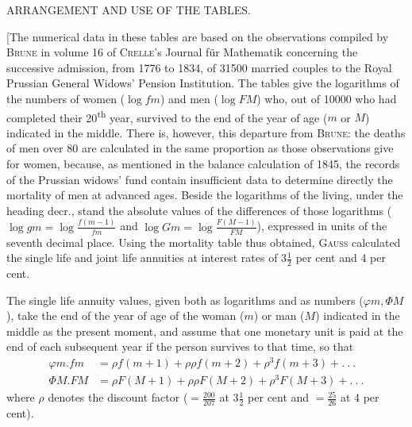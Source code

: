 \clearpage
{}
\begin{center}ARRANGEMENT AND USE OF THE TABLES.\end{center}
\noindent\hspace*{1.2em} [The numerical data in these tables are based on the observations compiled by \textsc{Brune} in volume 16 of \textsc{Crelle}'s Journal für Mathematik concerning the successive admission, from 1776 to 1834, of 31500 married couples to the Royal Prussian General Widows' Pension Institution. The tables give the logarithms of the numbers of women (\(\log fm\)) and men (\(\log FM\)) who, out of 10000 who had completed their 20\textsuperscript{th} year, survived to the end of the year of age (\(m\) or \(M\)) indicated in the middle. There is, however, this departure from \textsc{Brune}: the deaths of men over 80 are calculated in the same proportion as those observations give for women, because, as mentioned in the balance calculation of 1845, the records of the Prussian widows' fund contain insufficient data to determine directly the mortality of men at advanced ages. Beside the logarithms of the living, under the heading decr., stand the absolute values of the differences of those logarithms (\(\log gm=\log\frac{f(m-1)}{fm}\) and \(\log Gm=\log\frac{F(M-1)}{FM}\)), expressed in units of the seventh decimal place. Using the mortality table thus obtained, \textsc{Gauss} calculated the single life and joint life annuities at interest rates of \(3\tfrac{1}{2}\) per cent and 4 per cent.

The single life annuity values, given both as logarithms and as numbers (\(\varphi m,\Phi M\)), take the end of the year of age of the woman (\(m\)) or man (\(M\)) indicated in the middle as the present moment, and assume that one monetary unit is paid at the end of each subsequent year if the person survives to that time, so that
\[
\begin{aligned}
\varphi m\mathord{.}fm&=\rho f(m+1)+\rho\rho f(m+2)+\rho^3f(m+3)+.\ .\ .\\
\Phi M\mathord{.}FM&=\rho F(M+1)+\rho\rho F(M+2)+\rho^3F(M+3)+.\ .\ .
\end{aligned}
\]
where \(\rho\) denotes the discount factor (\(=\tfrac{200}{207}\) at \(3\tfrac{1}{2}\) per cent and \(=\tfrac{25}{26}\) at 4 per cent).

